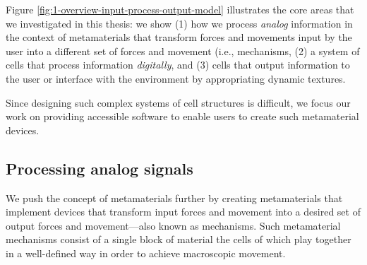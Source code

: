 Figure \ref{fig:1-overview-input-process-output-model} illustrates the core areas that we investigated in this thesis: we show (1) how we process \textit{analog} information in the context of metamaterials that transform forces and movements input by the user into a different set of forces and movement (i.e., mechanisms, (2) a system of cells that process information \textit{digitally}, and (3) cells that output information to the user or interface with the environment by appropriating dynamic textures.

Since designing such complex systems of cell structures is difficult, we focus our work on providing accessible software to enable users to create such metamaterial devices.

    
    




\subsection{Processing analog signals}
We push the concept of metamaterials further by creating metamaterials that implement devices that transform input forces and movement into a desired set of output forces and movement---also known as mechanisms. Such metamaterial mechanisms consist of a single block of material the cells of which play together in a well-defined way in order to achieve macroscopic movement.

